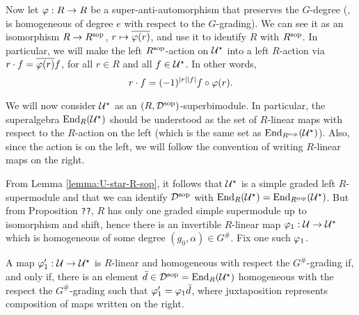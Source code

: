 
Now let $\varphi: R\to R$ be a super-anti-automorphism that preserves the $G$-degree (\ie, is homogeneous of degree $e$ with respect to the $G$-grading).
We can see it as an isomorphism $R\to R^{\mathrm{sop}}$, $r \mapsto \overline{ \varphi(r)}$, and use it to identify $R$ with $R^{\mathrm{sop}}$. 
In particular, we will make the left $R^{\mathrm{sop}}$-action on $\mathcal U^\star$ into a left $R$-action via $r\cdot f = \overline{\varphi(r)}f$, for all $r\in R$ and all $f\in \mathcal U^\star$. 
In other words,
%
\begin{equation}\label{eq:R-action-back-on-the-right}
    r\cdot f = (-1)^{|r||f|} f \circ \varphi(r) .
\end{equation}

We will now consider $\mathcal U^\star$ as an $(R,\mathcal{D}^{\mathrm{sop}})$-superbimodule. 
In particular, the superalgebra $\operatorname{End}_R(\mathcal U^\star)$ should be understood as the set of $R$-linear maps with respect to the $R$-action on the left (which is the same set as $\operatorname{End}_{R^{\mathrm{sop}}} (\mathcal U^\star)$). 
Also, since the action is on the left, we will follow the convention of writing $R$-linear maps on the right.

From Lemma \ref{lemma:U-star-R-sop}, it follows that $\mathcal U^\star$ is a simple graded left $R$-supermodule and that we can identify $\mathcal{D}^{\mathrm{sop}}$ with $\operatorname{End}_R (\mathcal U^\star) = \operatorname{End}_{R^{\mathrm{sop}}} (\mathcal U^\star)$. 
But from Proposition {\tt ??}, $R$ has only one graded simple supermodule up to isomorphism and shift, hence there is an invertible $R$-linear map $\varphi_1: \mathcal U \to \mathcal U^\star$ which is homogeneous of some degree $(g_0, \alpha)\in G^\#$. 
Fix one such $\varphi_1$.

\begin{lemma}\label{lemma:nonuniqueness-of-vphi1}
    A map $\varphi_1' : \mathcal U \to \mathcal U^\star$ is $R$-linear and homogeneous with respect the $G^\#$-grading if, and only if, there is an element $\bar d\in \mathcal{D}^{\mathrm{sop}} = \operatorname{End}_R (\mathcal U^\star)$ homogeneous with the respect the $G^\#$-grading such that $ \varphi_1' = \varphi_1 \bar d$, where juxtaposition represents composition of maps written on the right.
\end{lemma}

